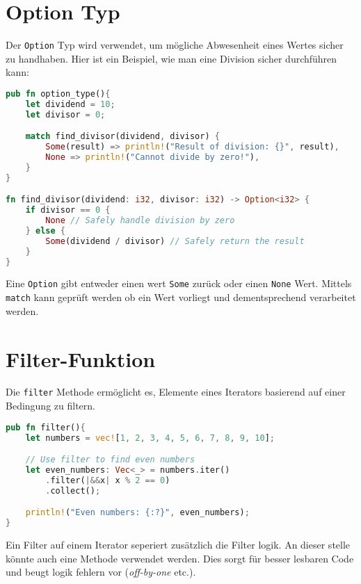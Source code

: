 \section{Option Typ}

Der \texttt{Option} Typ wird verwendet, um mögliche Abwesenheit eines Wertes sicher zu handhaben. Hier ist ein Beispiel, wie man eine Division sicher durchführen kann:

\begin{lstlisting}[language=Rust, caption=Option Typ]
pub fn option_type(){
    let dividend = 10;
    let divisor = 0;

    match find_divisor(dividend, divisor) {
        Some(result) => println!("Result of division: {}", result),
        None => println!("Cannot divide by zero!"),
    }
}

fn find_divisor(dividend: i32, divisor: i32) -> Option<i32> {
    if divisor == 0 {
        None // Safely handle division by zero
    } else {
        Some(dividend / divisor) // Safely return the result
    }
}
\end{lstlisting}
\noindent
Eine \texttt{Option} gibt entweder einen wert \texttt{Some} zurück oder einen \texttt{None} Wert.
Mittels \texttt{match} kann geprüft werden ob ein Wert vorliegt und dementsprechend verarbeitet werden.

\section{Filter-Funktion}

Die \texttt{filter} Methode ermöglicht es, Elemente eines Iterators basierend auf einer Bedingung zu filtern.

\begin{lstlisting}[language=Rust, caption=Filter-Funktion]
pub fn filter(){
    let numbers = vec![1, 2, 3, 4, 5, 6, 7, 8, 9, 10];

    // Use filter to find even numbers
    let even_numbers: Vec<_> = numbers.iter()
        .filter(|&&x| x % 2 == 0)
        .collect();

    println!("Even numbers: {:?}", even_numbers);
}
\end{lstlisting}
Ein Filter auf einem Iterator seperiert zusätzlich die Filter logik.
An dieser stelle könnte auch eine Methode verwendet werden.
Dies sorgt für besser lesbaren Code und beugt logik fehlern vor (\textit{\gls{off-by-one}} etc.).
